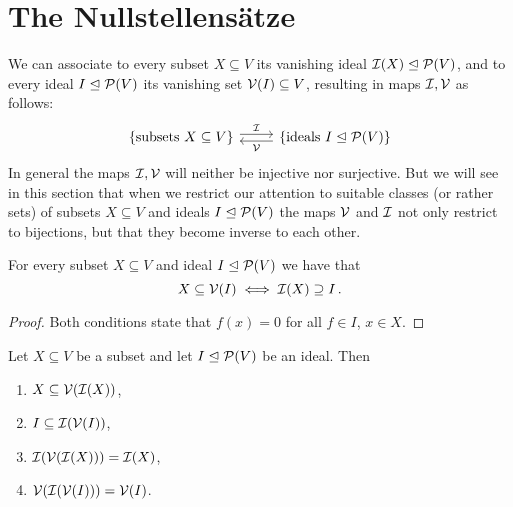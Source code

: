 \section{The Nullstellensätze}


\begin{fluff}
  We can associate to every subset $X \subseteq V$ its vanishing ideal $\mathcal{I}(X) \trianglelefteq \mathcal{P}(V)$, and to every ideal $I \trianglelefteq \mathcal{P}(V)$ its vanishing set $\mathcal{V}(I) \subseteq V$, resulting in maps $\mathcal{I}, \mathcal{V}$ as follows:
  \[
    \begin{tikzcd}
        \{ \text{subsets $X \subseteq V$} \}
        \arrow[shift left]{r}[above]{\mc{I}}
      & \{ \text{ideals $I \idealleq \mc{P}(V)$} \}
        \arrow[shift left]{l}[below]{\mc{V}}
    \end{tikzcd}
  \]
  In general the maps $\mathcal{I}, \mathcal{V}$ will neither be injective nor surjective.
  But we will see in this section that when we restrict our attention to suitable classes (or rather sets) of subsets $X \subseteq V$ and ideals $I \trianglelefteq \mathcal{P}(V)$ the maps $\mathcal{V}$ and $\mathcal{I}$ not only restrict to bijections, but that they become inverse to each other.
\end{fluff}


\begin{lemma}
  \label{lemma: galois connection for vanishing ideals and zero sets}
  For every subset $X \subseteq V$ and ideal $I \trianglelefteq \mathcal{P}(V)$ we have that
  \[
          X \subseteq \mathcal{V}(I)
    \iff  \mathcal{I}(X) \supseteq I \,.
  \]
\end{lemma}


\begin{proof}
  Both conditions state that $f(x) = 0$ for all $f \in I$, $x \in X$.
\end{proof}


\begin{lemma}
  \label{lemma: properties of V and I}
  Let $X \subseteq V$ be a subset and let $I \trianglelefteq \mathcal{P}(V)$ be an ideal.
  Then
  \begin{enumerate}
    \item
      \label{enumerate: VI is monotone}
      $X \subseteq \mathcal{V}(\mathcal{I}(X))$,
    \item
      \label{enumerate: IV is monotone}
      $I \subseteq \mathcal{I}(\mathcal{V}(I))$,
    \item
      \label{enumerate: IVI = I}
      $\mathcal{I}(\mathcal{V}(\mathcal{I}(X))) = \mathcal{I}(X)$,
    \item
      \label{enumerate: VIV = V}
      $\mathcal{V}(\mathcal{I}(\mathcal{V}(I))) = \mathcal{V}(I)$.
  \end{enumerate}
\end{lemma}


